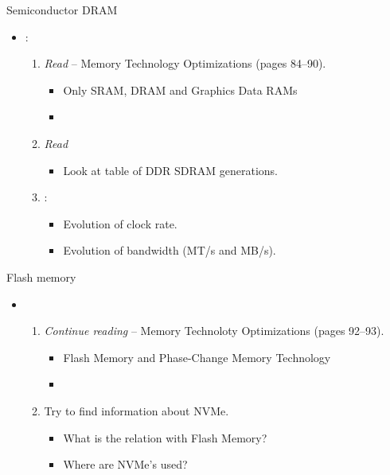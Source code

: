 \begin{frame}[t]{Semiconductor DRAM}
  \begin{itemize}
    \item {}:
      \begin{enumerate}
        \item \emph{Read}  -- 
              Memory Technology Optimizations (pages 84--90).
          \begin{itemize}
            \item Only SRAM, DRAM and Graphics Data RAMs
            \item \bibhennessy
          \end{itemize}

        \item \emph{Read} 
          \begin{itemize}
            \item Look at table of DDR SDRAM generations.
          \end{itemize}

        \item {}:
          \begin{itemize}
            \item Evolution of clock rate.
            \item Evolution of bandwidth (MT/s and MB/s).
          \end{itemize}
      \end{enumerate}
  \end{itemize}
\end{frame}

\begin{frame}[t]{Flash memory}
  \begin{itemize}
    \item {}
      \begin{enumerate}
        \item \emph{Continue reading}  -- 
              Memory Technoloty Optimizations (pages 92--93).
          \begin{itemize}
            \item Flash Memory and Phase-Change Memory Technology
            \item \bibhennessy
          \end{itemize}

        \item Try to find information about NVMe.
          \begin{itemize}
            \item What is the relation with Flash Memory?
            \item Where are NVMe's used?
          \end{itemize}
      \end{enumerate}
  \end{itemize}
\end{frame}

